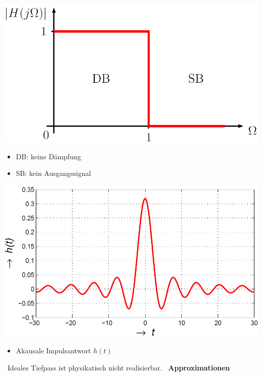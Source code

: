 \begin{minipage}[c]{0.48\columnwidth}
    \includegraphics[width=\columnwidth]{images/filter_toleranzschema_idealer_tiefpass.png}

    \begin{itemize}
        \item DB: keine Dämpfung
        \item SB: kein Ausgangssignal
    \end{itemize}
\end{minipage}
\hfill
\begin{minipage}[c]{0.42\columnwidth}
    \includegraphics[width=\columnwidth]{images/filter_impulsantwort_idealer_tiefpass.png}
    
    \begin{itemize}
        \item Akausale Impulsantwort $h(t)$
    \end{itemize}
\end{minipage}

\vspace{0.2cm}
\textrightarrow\ Ideales Tiefpass ist physikatisch nicht realisierbar. \textrightarrow\ \textbf{Approximationen}


